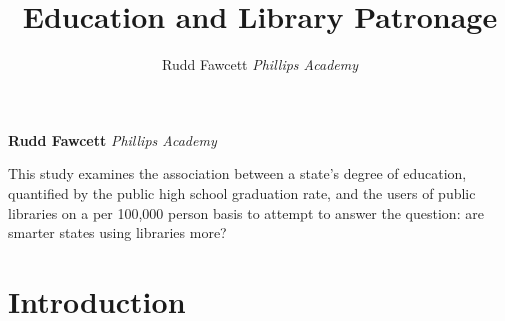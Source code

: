 \documentclass[12pt,]{article}
\title{Education and Library Patronage  }
\author{\Large Rudd Fawcett\vspace{0.05in} \newline\normalsize\emph{Phillips Academy}  }
\date{}
\newcommand*{\authorfont}{\fontfamily{phv}\selectfont}
\renewenvironment{abstract}
 {{%
    \setlength{\leftmargin}{0mm}
    \setlength{\rightmargin}{\leftmargin}%
  }%
  \relax}
 {\endlist}
\begin{document}
	
%

{%
\setlength{\parindent}{0pt}
\thispagestyle{plain}
{\fontsize{18}{20}\selectfont\raggedright 
\maketitle  %

}

{
   \vskip 13.5pt\relax \normalsize\fontsize{11}{12} 
\textbf{\authorfont Rudd Fawcett} \hskip 15pt \emph{\small Phillips Academy}   

}

}








\begin{abstract}

    \hbox{\vrule height .2pt width 39.14pc}

    \vskip 8.5pt %

\noindent This study examines the association between a state's degree of
education, quantified by the public high school graduation rate, and the
users of public libraries on a per 100,000 person basis to attempt to
answer the question: are smarter states using libraries more?


    \hbox{\vrule height .2pt width 39.14pc}


\end{abstract}


\vskip 6.5pt


\noindent \doublespacing \newpage

\section{Introduction}\label{introduction}
\end{document}

